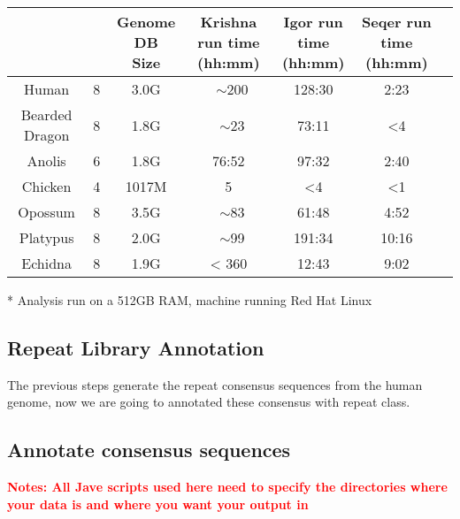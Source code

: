 \documentclass[12pt]{report}
\begin{document}
\footnotesize  %
\setlength\tabcolsep{1.5pt}
\begin{center}
	\begin{tabular}{|c|c|c|c|c|c|c|}
		\hline
		\thead{Genome}	&	\thead{ Krishna Threads }	&	\thead{Genome DB \\ Size}	& \thead{Krishna run time \\ (hh:mm)}	&	\thead{Igor run time \\ (hh:mm)}	&	\thead{Seqer run time \\ (hh:mm)}  \\
		\hline
		Human	&	8	&	3.0G	&	~$\sim$200	&	128:30	&	2:23 \\
		\hline 
		Bearded Dragon	&	8	&	1.8G	&	~$\sim$23	&	73:11	&	{<}4 \\
		\hline
		Anolis	& 6	& 1.8G	& 76:52	&	97:32	& 2:40	\\
		\hline
		Chicken	&	4	&	1017M	&	5	&	{<}4 & {<}1 \\
		\hline
		Opossum	&	8	&	3.5G	&	~$\sim$83	&	61:48	&	4:52 \\
		\hline
		Platypus	&	8	&	2.0G	&	~$\sim$99	&	191:34	&	10:16 \\
		\hline
		Echidna	&	8	&	1.9G	&	{<} 360	&	12:43	&	9:02 \\
		\hline
	\end{tabular}
\end{center}

* Analysis run on a 512GB RAM, machine running Red Hat Linux




\subsection*{Repeat Library Annotation}
The previous steps generate the repeat consensus sequences from the human genome, now we are going to annotated these consensus with repeat class.
\subsection*{Annotate consensus sequences}
\textbf{\textcolor{red}{Notes: All Jave scripts used here need to specify the directories where your data is and where you want your output in }}
\end{document}
